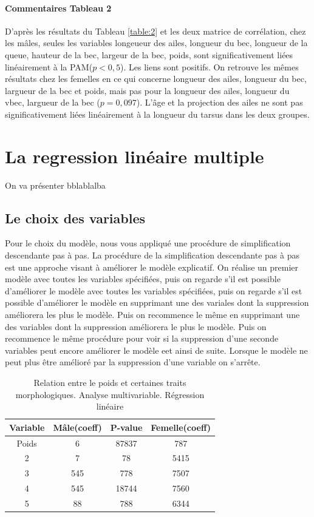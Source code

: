 \documentclass[12pt, twocolumn]{article}
\begin{document}
\paragraph{Commentaires Tableau 2}

D'après les résultats du Tableau \ref{table:2} et les deux matrice de corrélation, chez les mâles, seules les variables longeueur des ailes, longueur du bec, longueur de la queue, hauteur de la bec, largeur
de la bec, poids, sont significativement liées linéairement à la PAM($ p < 0,5 $). Les liens sont positifs. On retrouve les mêmes résultats chez les femelles en ce qui concerne longueur des ailes, longueur du bec, largueur de la bec et poids,
mais pas pour la longueur des ailes, longueur du vbec, largueur de la bec ($p = 0,097$). L'âge et la projection des ailes ne sont pas significativement liées linéairement à la longueur du tarsus dans les deux groupes.

\section{La regression linéaire multiple}
On va présenter bblablalba

\subsection{Le choix des variables}
Pour le choix du modèle, nous vous appliqué une procédure de simplification descendante pas à pas. La procédure de la simplification
descendante pas à pas est une approche visant à améliorer le modèle explicatif. On réalise un premier modèle avec toutes les variables spécifiées,
puis on regarde s'il est possible d'améliorer le modèle avec toutes les variables spécifiées, puis on regarde s'il est possible d'améliorer le modèle
en supprimant une des variales dont la suppression améliorera les plus le modèle. Puis on recommence le même en supprimant une des variables dont la suppression améliorera le plus le modèle.
Puis on recommence le même procédure pour voir si la suppression d'une seconde variables peut encore améliorer le modèle eet ainsi de suite. Lorsque le modèle ne peut plus être amélioré par la suppression
d'une variable on s'arrête.

\begin{table}[h!]
    \centering
    \begin{tabular}{||c c c c||} 
     \hline
     Variable & Mâle(coeff) & P-value & Femelle(coeff) \\ [0.5ex] 
     \hline\hline
     Poids & 6 & 87837 & 787 \\ 
     2 & 7 & 78 & 5415 \\
     3 & 545 & 778 & 7507 \\
     4 & 545 & 18744 & 7560 \\
     5 & 88 & 788 & 6344 \\ [0.5ex] 
     \hline
    \end{tabular}
    \caption{Relation entre le poids et certaines traits morphologiques. Analyse multivariable. Régression linéaire}
    \label{table:3}
\end{table}
\end{document}
